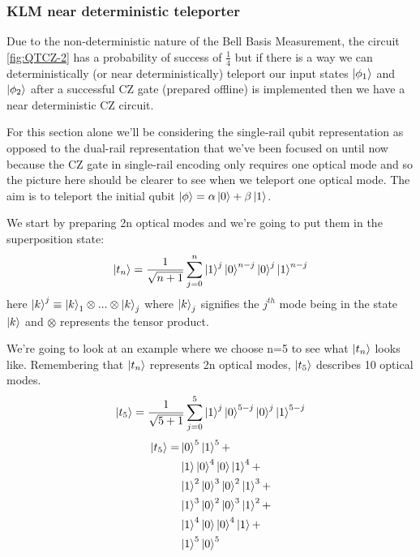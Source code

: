 \subsubsection{KLM near deterministic teleporter}
Due to the non-deterministic nature of the Bell Basis Measurement, the circuit \cref{fig:QTCZ-2} has a probability of success of $\frac{1}{4}$ but if there is a way we can deterministically (or near deterministically) teleport our input states $\ket{\phi_1}$ and $\ket{\phi_2}$ after a successful CZ gate (prepared offline) is implemented then we have a near deterministic CZ circuit.
\par
For this section alone we'll be considering the single-rail qubit representation as opposed to the dual-rail representation that we've been focused on until now because the CZ gate in single-rail encoding only requires one optical mode and so the picture here should be clearer to see when we teleport one optical mode. The aim is to teleport the initial qubit $\ket{\phi} = \alpha\ket{0} + \beta\ket{1}$.
\par
We start by preparing 2n optical modes and we're going to put them in the superposition state:
    \begin{equation}
        \ket{t_n} = \frac{1}{\sqrt{n+1}}\sum\limits_{j=0}^{n}\ket{1}^j\ket{0}^{n-j}\ket{0}^j\ket{1}^{n-j}
        \label{eqn: QFT Teleporter EQ}
    \end{equation} \cite{KnillE2001Asfe}\cite{Kok:2005jip}
here $\ket{k}^j \equiv \ket{k}_1 \otimes...\otimes\ket{k}_j$ where $\ket{k}_j$ signifies the $j^{th}$ mode being in the state $\ket{k}$ and $\otimes$ represents the tensor product. 
\par
We're going to look at an example where we choose n=5 to see what $\ket{t_n}$ looks like. Remembering that $\ket{t_n}$ represents 2n optical modes, $\ket{t_5}$ describes 10 optical modes.
\begin{equation}
        \ket{t_5} = \frac{1}{\sqrt{5+1}}\sum\limits_{j=0}^5\ket{1}^j\ket{0}^{5-j}\ket{0}^j\ket{1}^{5-j}
    \end{equation}
    \begin{align} 
        \ket{t_5} =  & \ket{0}^{5}\ket{1}^5 
        + \\ & \ket{1}\ket{0}^{4}\ket{0}\ket{1}^{4} + 
 \\ & \ket{1}^2\ket{0}^{3}\ket{0}^2\ket{1}^{3} \label{t5:1} + \\ & \ket{1}^3\ket{0}^{2}\ket{0}^3\ket{1}^{2}\label{t5:2} + \\  & \ket{1}^4\ket{0}\ket{0}^4\ket{1} + \\ & \ket{1}^{5}\ket{0}^5  
 \label{eqn: t5 breakdown}
\end{align}
